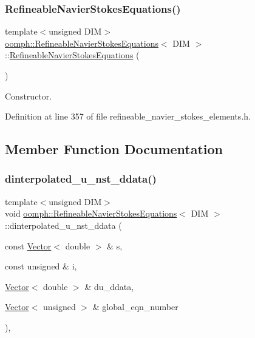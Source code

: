 \subsubsection{\texorpdfstring{Refineable\+Navier\+Stokes\+Equations()}{RefineableNavierStokesEquations()}}
{\footnotesize\ttfamily template$<$unsigned D\+IM$>$ \\
\hyperlink{classoomph_1_1RefineableNavierStokesEquations}{oomph\+::\+Refineable\+Navier\+Stokes\+Equations}$<$ D\+IM $>$\+::\hyperlink{classoomph_1_1RefineableNavierStokesEquations}{Refineable\+Navier\+Stokes\+Equations} (\begin{DoxyParamCaption}{ }\end{DoxyParamCaption})\hspace{0.3cm}{\ttfamily [inline]}}



Constructor. 



Definition at line 357 of file refineable\+\_\+navier\+\_\+stokes\+\_\+elements.\+h.



\subsection{Member Function Documentation}
\mbox{\label{classoomph_1_1RefineableNavierStokesEquations_a7cfd72b42cc9fc665fa79ffe9af9f0bd}} 
\subsubsection{\texorpdfstring{dinterpolated\+\_\+u\+\_\+nst\+\_\+ddata()}{dinterpolated\_u\_nst\_ddata()}}
{\footnotesize\ttfamily template$<$unsigned D\+IM$>$ \\
void \hyperlink{classoomph_1_1RefineableNavierStokesEquations}{oomph\+::\+Refineable\+Navier\+Stokes\+Equations}$<$ D\+IM $>$\+::dinterpolated\+\_\+u\+\_\+nst\+\_\+ddata (\begin{DoxyParamCaption}\item[{const \hyperlink{classoomph_1_1Vector}{Vector}$<$ double $>$ \&}]{s,  }\item[{const unsigned \&}]{i,  }\item[{\hyperlink{classoomph_1_1Vector}{Vector}$<$ double $>$ \&}]{du\+\_\+ddata,  }\item[{\hyperlink{classoomph_1_1Vector}{Vector}$<$ unsigned $>$ \&}]{global\+\_\+eqn\+\_\+number }\end{DoxyParamCaption})\hspace{0.3cm}{\ttfamily [inline]}, {\ttfamily [virtual]}}



